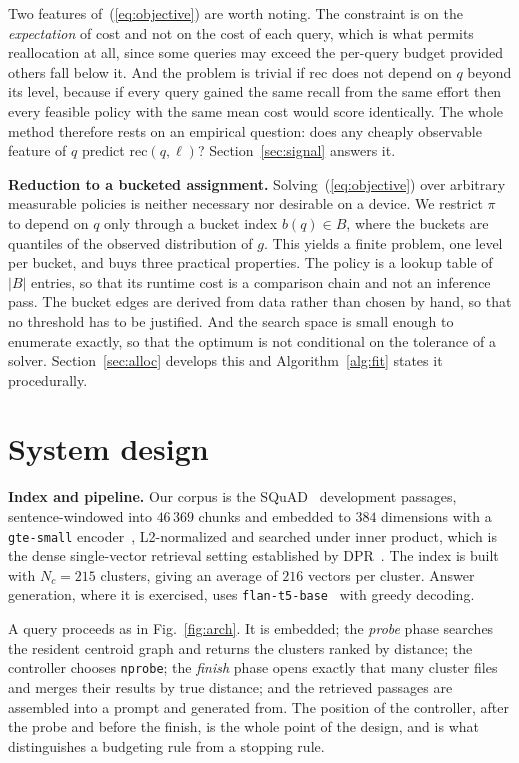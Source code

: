 \documentclass[journal]{IEEEtran}
\newcommand{\nprobe}{\texttt{nprobe}}
\begin{document}
Two features of~(\ref{eq:objective}) are worth noting. The constraint is on
the \emph{expectation} of cost and not on the cost of each query, which is
what permits reallocation at all, since some queries may exceed the
per-query budget provided others fall below it. And the problem is trivial
if $\mathrm{rec}$ does not depend on $q$ beyond its level, because if every
query gained the same recall from the same effort then every feasible
policy with the same mean cost would score identically. The whole method
therefore rests on an empirical question: does any cheaply observable
feature of $q$ predict $\mathrm{rec}(q,\ell)$? Section~\ref{sec:signal}
answers it.

\textbf{Reduction to a bucketed assignment.} Solving~(\ref{eq:objective})
over arbitrary measurable policies is neither necessary nor desirable on a
device. We restrict $\pi$ to depend on $q$ only through a bucket index
$b(q) \in B$, where the buckets are quantiles of the observed distribution
of $g$. This yields a finite problem, one level per bucket, and buys three
practical properties. The policy is a lookup table of $|B|$ entries, so
that its runtime cost is a comparison chain and not an inference pass. The
bucket edges are derived from data rather than chosen by hand, so that no
threshold has to be justified. And the search space is small enough to
enumerate exactly, so that the optimum is not conditional on the tolerance
of a solver. Section~\ref{sec:alloc} develops this and
Algorithm~\ref{alg:fit} states it procedurally.

\section{System design}
\label{sec:design}

\textbf{Index and pipeline.} Our corpus is the SQuAD~\cite{rajpurkar2016squad}
development passages, sentence-windowed into $46\,369$ chunks and embedded
to $384$ dimensions with a \texttt{gte-small} encoder~\cite{li2023gte},
L2-normalized and searched under inner product, which is the dense
single-vector retrieval setting established by DPR~\cite{karpukhin2020dpr}.
The index is built with $N_c = 215$ clusters, giving an average of $216$
vectors per cluster. Answer generation, where it is exercised, uses
\texttt{flan-t5-base}~\cite{chung2024flan} with greedy decoding.

A query proceeds as in Fig.~\ref{fig:arch}. It is embedded; the
\emph{probe} phase searches the resident centroid graph and returns the
clusters ranked by distance; the controller chooses \nprobe; the
\emph{finish} phase opens exactly that many cluster files and merges their
results by true distance; and the retrieved passages are assembled into a
prompt and generated from. The position of the controller, after the probe
and before the finish, is the whole point of the design, and is what
distinguishes a budgeting rule from a stopping rule.
\end{document}
